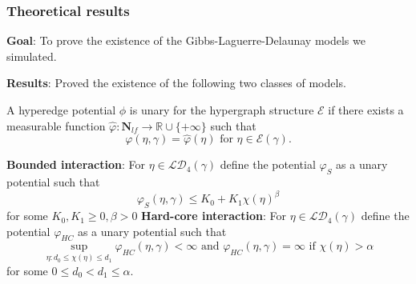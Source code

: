 \documentclass[c, 10pt]{beamer}
\begin{document}
\begin{frame}\frametitle{Theoretical results}

	{\small

	\alert{\textbf{Goal}}: To prove the existence of the Gibbs-Laguerre-Delaunay models we simulated.
	

	\alert{\textbf{Results}}: Proved the existence of the following two classes of models.

	\vspace{5mm}
	
	A hyperedge potential $\phi$ is \alert{unary} for the hypergraph structure $\mathcal E$ if there exists a measurable function $\hat\varphi:\mathbf N_{lf} \to \mathbb R \cup \{+\infty\}$ such that
	$$\varphi(\eta,\gamma) = \hat\varphi(\eta) \text{ for } \eta \in \mathcal E(\gamma).$$

	\noindent \textbf{Bounded interaction}:  For $\eta\in\mathcal {LD}_4(\gamma)$ define the potential $\varphi_S$ as a unary potential such that
$$\varphi_S(\eta,\gamma) \leq K_0 + K_1 \chi(\eta)^{\beta}$$
for some $K_0,K_1 \geq 0, \beta >0$\newline
	\textbf{Hard-core interaction}: For $\eta\in\mathcal {LD}_4(\gamma)$ define the potential $\varphi_{HC}$ as a unary potential such that
$$\sup_{\eta: d_0 \leq \chi(\eta) \leq d_1} \varphi_{HC}(\eta,\gamma)  < \infty \text{ and } \varphi_{HC}(\eta,\gamma)=\infty \text{ if } \chi(\eta)>\alpha$$ 
for some $0\leq d_0 < d_1 \leq \alpha$. 


	}






\end{frame}
\end{document}
